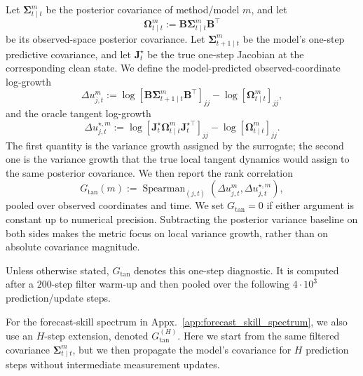 \documentclass{article}
\theoremstyle{plain}
\theoremstyle{definition}
\theoremstyle{remark}
\begin{document}
Let $\bm\Sigma^m_{t\mid t}$ be the posterior covariance of method/model $m$, and let
\[
\bm \Omega^m_{t\mid t}:=\bm B\bm\Sigma^m_{t\mid t}\bm B^\top
\]
be its observed-space posterior covariance. Let
$\bm\Sigma^m_{t+1\mid t}$ be the model's one-step predictive covariance, and let $\bm J^\star_t$ be the true one-step Jacobian at the corresponding clean state. We define the model-predicted observed-coordinate log-growth
\[
\Delta u^m_{j,t}
:=
\log\left[\bm B\bm\Sigma^m_{t+1\mid t}\bm B^\top\right]_{jj}-\log\left[\bm \Omega^m_{t\mid t}\right]_{jj},
\]
and the oracle tangent log-growth
\[
\Delta u^{\star,m}_{j,t}:=\log\left[\bm J^\star_t\bm \Omega^m_{t\mid t}\bm J_t^{\star\top}\right]_{jj}-\log\left[\bm \Omega^m_{t\mid t}\right]_{jj}.
\]
The first quantity is the variance growth assigned by the surrogate; the second one is the variance growth that the true local tangent dynamics would assign to the same posterior covariance. We then report the rank correlation
\begin{equation}
\label{eq:gtan}
G_{\mathrm{tan}}(m) :=
\operatorname{Spearman}_{(j,t)}
\left(\Delta u^m_{j,t},\Delta u^{\star,m}_{j,t}\right),
\end{equation}
pooled over observed coordinates and time. We set $G_{\mathrm{tan}}=0$ if either
argument is constant up to numerical precision. Subtracting the posterior
variance baseline on both sides makes the metric focus on local variance growth, rather than on absolute covariance magnitude. 

Unless otherwise stated, $G_{\mathrm{tan}}$ denotes this one-step diagnostic. It is computed after a $200$-step filter warm-up and then pooled over the following
$4\cdot 10^3$ prediction/update steps.

For the forecast-skill spectrum in Appx.~\ref{app:forecast_skill_spectrum}, we
also use an $H$-step extension, denoted $G_{\mathrm{tan}}^{(H)}$. Here we start from the same filtered covariance $\bm\Sigma^m_{t\mid t}$, but we then propagate the model's covariance for $H$ prediction steps without intermediate measurement updates.
\end{document}
